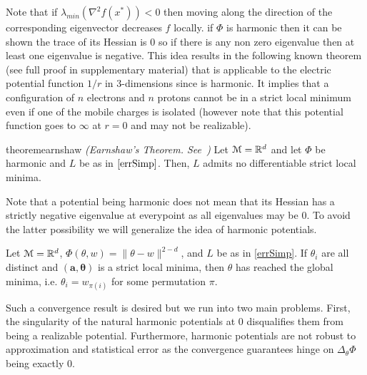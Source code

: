 Note that if $\lambda_{min}(\nabla^2 f(x^*)) < 0$ then moving along the direction of the corresponding eigenvector decreases $f$ locally. if $\Phi$ is harmonic then it can be shown the trace of its Hessian is $0$ so 
if there is any non zero eigenvalue then at least one eigenvalue is negative. This idea results in the following known theorem (see full proof in supplementary material) that is applicable to the electric potential  
function $1/r$ in $3$-dimensions since is harmonic. It implies that a configuration of $n$ electrons and $n$ protons cannot be in a strict local minimum even if one of the mobile charges is isolated
(however note that this potential function goes to $\infty$ at $r=0$ and may not be realizable).

\begin{restatable}{theorem}{earnshaw}
\emph{(Earnshaw's Theorem. See~\cite{arnold1985mathematical})}
\label{Earnshaw} 
Let $\mathcal{M} = {\mathbb{R}}^d$ and let $\Phi$ be harmonic and $L$
be as in $\eqref{errSimp}$. Then, $L$ admits no
differentiable strict local minima.
\end{restatable}
%

Note that a potential being harmonic does not mean that its Hessian has a strictly negative eigenvalue at everypoint as all eigenvalues may be $0$. To
avoid the latter possibility we will generalize the idea of harmonic potentials. 

\begin{corollary}
Let $\mathcal{M} = {\mathbb{R}}^d$, $\Phi(\theta,w) = \|\theta-w\|^{2-d}$, and $L$ be as in \eqref{errSimp}. If $\theta_i$ are all distinct and $(\boldsymbol{a,\theta})$ is a strict local minima, then $\theta$ has reached the global minima, i.e. $\theta_i = w_{\pi(i)}$ for some permutation $\pi$. 
\end{corollary}
\fi



\iffalse
Such a convergence result is desired but we run into two main problems. First, the singularity of the natural harmonic potentials at $0$ disqualifies them from being a realizable potential. Furthermore, harmonic potentials are not robust to approximation and statistical error as the convergence guarantees hinge on $\Delta_\theta\Phi$ being exactly 0. 

